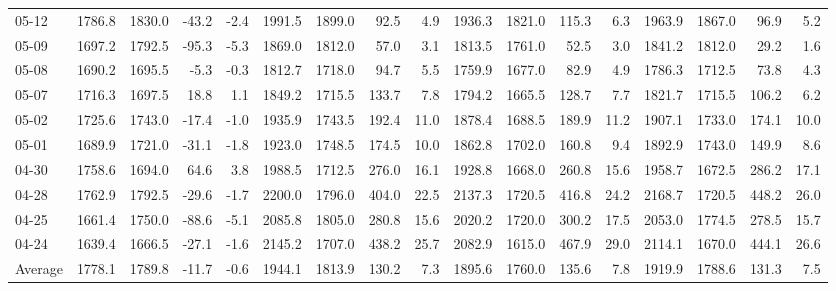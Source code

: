 \begin{threeparttable}
{\begin{tabular}{lrrrrrrrrrrrrrrrr}
  05-12 & 1786.8 & 1830.0 &      -43.2 &           -2.4 & 1991.5 & 1899.0 &       92.5 &            4.9 & 1936.3 & 1821.0 &      115.3 &            6.3 & 1963.9 & 1867.0 &        96.9 &              5.2 \\
  05-09 & 1697.2 & 1792.5 &      -95.3 &           -5.3 & 1869.0 & 1812.0 &       57.0 &            3.1 & 1813.5 & 1761.0 &       52.5 &            3.0 & 1841.2 & 1812.0 &        29.2 &              1.6 \\
  05-08 & 1690.2 & 1695.5 &       -5.3 &           -0.3 & 1812.7 & 1718.0 &       94.7 &            5.5 & 1759.9 & 1677.0 &       82.9 &            4.9 & 1786.3 & 1712.5 &        73.8 &              4.3 \\
  05-07 & 1716.3 & 1697.5 &       18.8 &            1.1 & 1849.2 & 1715.5 &      133.7 &            7.8 & 1794.2 & 1665.5 &      128.7 &            7.7 & 1821.7 & 1715.5 &       106.2 &              6.2 \\
  05-02 & 1725.6 & 1743.0 &      -17.4 &           -1.0 & 1935.9 & 1743.5 &      192.4 &           11.0 & 1878.4 & 1688.5 &      189.9 &           11.2 & 1907.1 & 1733.0 &       174.1 &             10.0 \\
  05-01 & 1689.9 & 1721.0 &      -31.1 &           -1.8 & 1923.0 & 1748.5 &      174.5 &           10.0 & 1862.8 & 1702.0 &      160.8 &            9.4 & 1892.9 & 1743.0 &       149.9 &              8.6 \\
  04-30 & 1758.6 & 1694.0 &       64.6 &            3.8 & 1988.5 & 1712.5 &      276.0 &           16.1 & 1928.8 & 1668.0 &      260.8 &           15.6 & 1958.7 & 1672.5 &       286.2 &             17.1 \\
  04-28 & 1762.9 & 1792.5 &      -29.6 &           -1.7 & 2200.0 & 1796.0 &      404.0 &           22.5 & 2137.3 & 1720.5 &      416.8 &           24.2 & 2168.7 & 1720.5 &       448.2 &             26.0 \\
  04-25 & 1661.4 & 1750.0 &      -88.6 &           -5.1 & 2085.8 & 1805.0 &      280.8 &           15.6 & 2020.2 & 1720.0 &      300.2 &           17.5 & 2053.0 & 1774.5 &       278.5 &             15.7 \\
  04-24 & 1639.4 & 1666.5 &      -27.1 &           -1.6 & 2145.2 & 1707.0 &      438.2 &           25.7 & 2082.9 & 1615.0 &      467.9 &           29.0 & 2114.1 & 1670.0 &       444.1 &             26.6 \\
Average & 1778.1 & 1789.8 &      -11.7 &           -0.6 & 1944.1 & 1813.9 &      130.2 &            7.3 & 1895.6 & 1760.0 &      135.6 &            7.8 & 1919.9 & 1788.6 &       131.3 &              7.5 \\

\end{tabular}}
\end{threeparttable}
